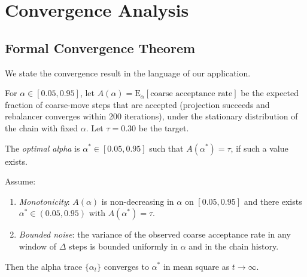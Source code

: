 \section{Convergence Analysis}
\label{sec:convergence}

\subsection{Formal Convergence Theorem}

We state the convergence result in the language of our application.

\begin{definition}
  \label{def:accept-fn}
  For $\alpha \in [0.05, 0.95]$, let
  $A(\alpha) = \mathrm{E}_\alpha[\text{coarse acceptance rate}]$
  be the expected fraction of coarse-move steps that are accepted (projection
  succeeds and rebalancer converges within 200 iterations), under the
  stationary distribution of the \ams{} chain with fixed $\alpha$.
  Let $\tau = 0.30$ be the target.
\end{definition}

\begin{definition}
  \label{def:alpha-star}
  The \emph{optimal alpha} is $\alpha^* \in [0.05, 0.95]$ such that
  $A(\alpha^*) = \tau$, if such a value exists.
\end{definition}

\begin{theorem}
  \label{thm:convergence}
  Assume:
  \begin{enumerate}
    \item[\textup{(M)}] \emph{Monotonicity}: $A(\alpha)$ is non-decreasing in $\alpha$ on
      $[0.05, 0.95]$ and there exists $\alpha^* \in (0.05, 0.95)$ with
      $A(\alpha^*) = \tau$.
    \item[\textup{(B)}] \emph{Bounded noise}: the variance of the observed coarse
      acceptance rate in any window of $\Delta$ steps is bounded uniformly in
      $\alpha$ and in the chain history.
  \end{enumerate}
  Then the \ams{} alpha trace $\{\alpha_t\}$ converges to $\alpha^*$ in
  mean square as $t \to \infty$.
\end{theorem}

